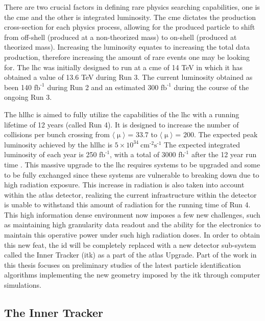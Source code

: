 There are two crucial factors in defining rare physics searching capabilities, one is the \gls{cme} and the other is integrated luminosity. The \gls{cme} dictates the 
production cross-section for each physics process, allowing for the produced particle to shift from off-shell (produced at a non-theorized mass) to on-shell (produced at 
theorized mass). Increasing the luminosity equates to increasing the total data production, therefore increasing the amount of rare events one may be looking for. The \gls{lhc} was 
initially designed to run at a \gls{cme} of 14 TeV in which it has obtained a value of 13.6 TeV during Run 3. The current luminosity obtained as been 140 f$\textrm{b}^{\textrm{-1}}$
during Run 2 and an estimated 300 f$\textrm{b}^{\textrm{-1}}$ during the course of the ongoing Run 3. 
\par
The \gls{hllhc} is aimed to fully utilize the capabilities of the \gls{lhc} with a running lifetime of 12 years (called Run 4). It is designed to increase the number of collisions per bunch 
crossing from $\langle \upmu \rangle$ = $\textrm{33.7}$ to $\langle \upmu \rangle$ = $\textrm{200}$. The expected peak luminosity achieved by the \gls{hllhc} is $\textrm{5} \times \textrm{10}^{\textrm{34}} \ \textrm{cm}^{\textrm{-2}}\textrm{s}^{\textrm{-1}}$
The expected integrated luminosity of each year is 250 f$\textrm{b}^{\textrm{-1}}$, with a total of 3000 f$\textrm{b}^{\textrm{-1}}$ after the 12 year run time \cite{hllhc-tech}.
This massive upgrade to the \gls{lhc} requires systems to be upgraded and some to be fully exchanged since these systems are vulnerable to breaking down due to high radiation 
exposure. This increase in radiation is also taken into account within the \gls{atlas} detector, realizing the current infrastructure within the detector is unable 
to withstand this amount of radiation for the running time of Run 4. This high information dense environment now imposes a few new challenges, such as maintaining high 
granularity data readout and the ability for the electronics to maintain this operative power under such high radiation doses. In order to obtain this new feat, the \gls{id} 
will be completely replaced with a new detector sub-system called the Inner Tracker (\gls{itk}) as a part of the \gls{atlas} Upgrade. Part of the work in this thesis 
focuses on preliminary studies of the latest particle identification algorithms implementing the new geometry imposed by the \gls{itk} through computer simulations.

\subsection{The Inner Tracker}

